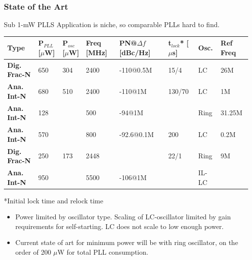 \documentclass[t, screen, aspectratio=43]{beamer}
\begin{document}
\begin{frame}
	\frametitle{State of the Art}
	\begin{block}{Sub 1-mW PLLS}
		\footnotesize Application is niche, so comparable PLLs hard to find.
		\vspace{-1em}
		\begin{table}[htb!]
			\tiny
			\centering
			\def\arraystretch{1.5}		
			\setlength\arrayrulewidth{0.75pt}
			\setlength{\tabcolsep}{1em} %
			\begin{tabular}{|l|l|l|l|l|l|l|l|}
				\hline 
				\rule[-1ex]{0pt}{2.5ex} \cellcolor{gray!40}\textbf{Type} & \cellcolor{gray!40}\textbf{P$_{PLL}$ [$\mu$W]}& \cellcolor{gray!40}\textbf{P$_{osc}$ [$\mu$W] }& \cellcolor{gray!40}\textbf{Freq [MHz]} & \cellcolor{gray!40}\textbf{PN@$\Delta f$ [dBc/Hz]}& \cellcolor{gray!40}\textbf{t$_{lock}$* [$\mu$s]}& \cellcolor{gray!40}\textbf{Osc. }& \cellcolor{gray!40}\textbf{Ref Freq}\\ 
				\hline 
				\rule[-1ex]{0pt}{2.5ex} \textbf{Dig. Frac-N} & 650 & 304 & 2400 & -110@0.5M & 15/4 & LC & 26M\\ 
				\hline 
				\rule[-1ex]{0pt}{2.5ex} \textbf{Ana. Int-N }& 680 & 510 & 2400 & -110@1M & 130/70 & LC & 1M\\ 
				\hline 
				\rule[-1ex]{0pt}{2.5ex} \textbf{Ana. Int-N} & 128 &  & 500 & -94@1M &  & Ring & 31.25M\\ 
				\hline 
				\rule[-1ex]{0pt}{2.5ex} \textbf{Ana. Int-N} & 570 &  & 800 & -92.6@0.1M & 200 & LC & 0.2M\\ 
				\hline 
				\rule[-1ex]{0pt}{2.5ex} \textbf{Dig. Frac-N} & 250 & 173 & 2448 &  & 22/1 & Ring & 9M\\ 
				\hline 
				\rule[-1ex]{0pt}{2.5ex} \textbf{Ana. Int-N} & 950 &  & 5500 & -106@1M &  & IL-LC & \\ 
				\hline 
			\end{tabular} 
		\end{table}  
		\tiny
		\vspace{-1em}
		*Initial lock time and relock time
		\begin{itemize}
			\scriptsize
			\item Power limited by oscillator type. Scaling of LC-oscillator limited by gain requirements for self-starting. LC does not scale to low enough power.
			\item Current state of art for minimum power will be with ring oscillator, on the order of 200 $\mu$W for total PLL consumption.
		\end{itemize}
	\end{block}

\end{frame}
\end{document}
